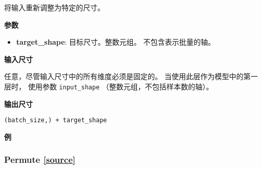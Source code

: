 \begin{Shaded}
\begin{Highlighting}[]
\end{Highlighting}
\end{Shaded}

将输入重新调整为特定的尺寸。

\textbf{参数}

\begin{itemize}
\tightlist
\item
  \textbf{target\_shape}: 目标尺寸。整数元组。 不包含表示批量的轴。
\end{itemize}

\textbf{输入尺寸}

任意，尽管输入尺寸中的所有维度必须是固定的。
当使用此层作为模型中的第一层时， 使用参数 \texttt{input\_shape}
（整数元组，不包括样本数的轴）。

\textbf{输出尺寸}

\texttt{(batch\_size,)\ +\ target\_shape}

\textbf{例}

\begin{Shaded}
\begin{Highlighting}[]
\OperatorTok{=} 
\NormalTok{, }\OperatorTok{=}\NormalTok{(}\NormalTok{,)))}

\NormalTok{, }\NormalTok{)))}

\OperatorTok{-}\NormalTok{, }\NormalTok{, }\NormalTok{)))}
\end{Highlighting}
\end{Shaded}


\subsubsection{Permute {\href{https://github.com/keras-team/keras/blob/master/keras/layers/core.py\#L413}{{[}source{]}}}}

